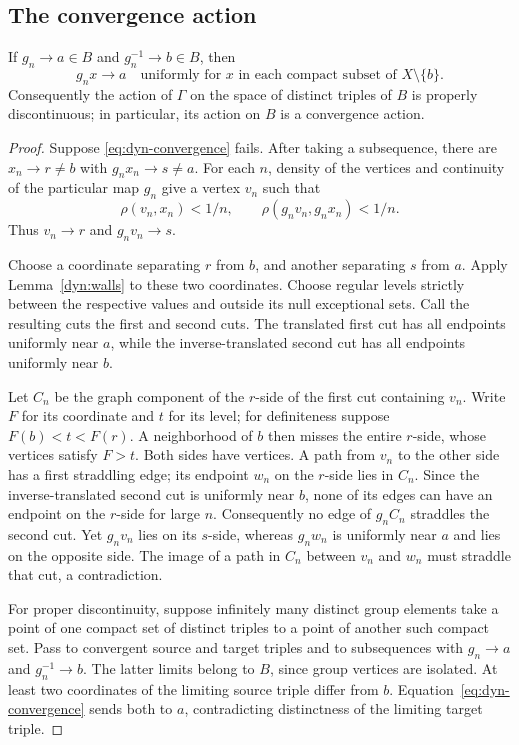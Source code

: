\subsection{The convergence action}

\begin{proposition}\label{dyn:convergence}
If $g_n\to a\in B$ and $g_n^{-1}\to b\in B$, then
\begin{equation}
 g_nx\longrightarrow a
 \quad\text{uniformly for $x$ in each compact subset of }X\setminus\{b\}.
 \label{eq:dyn-convergence}
\end{equation}
Consequently the action of $\Gamma$ on the space of distinct triples
of $B$ is properly discontinuous; in particular, its action on $B$ is
a convergence action.
\end{proposition}

\begin{proof}
Suppose \eqref{eq:dyn-convergence} fails. After taking a subsequence,
there are $x_n\to r\ne b$ with $g_nx_n\to s\ne a$. For each $n$,
density of the vertices and continuity of the particular map $g_n$
give a vertex $v_n$ such that
\[
 \rho(v_n,x_n)<1/n,
 \qquad \rho(g_nv_n,g_nx_n)<1/n.
\]
Thus $v_n\to r$ and $g_nv_n\to s$.

Choose a coordinate separating $r$ from $b$, and another separating
$s$ from $a$. Apply Lemma~\ref{dyn:walls} to these two coordinates.
Choose regular levels strictly between the respective values and
outside its null exceptional sets. Call the resulting cuts the first
and second cuts. The translated first cut has all endpoints uniformly
near $a$, while the inverse-translated second cut has all endpoints
uniformly near $b$.

Let $C_n$ be the graph component of the $r$-side of the first cut
containing $v_n$. Write $F$ for its coordinate and $t$ for its level;
for definiteness suppose $F(b)<t<F(r)$. A neighborhood of $b$ then
misses the entire $r$-side, whose vertices satisfy $F>t$.
Both sides have vertices. A path from $v_n$ to the
other side has a first straddling edge; its endpoint $w_n$ on the
$r$-side lies in $C_n$. Since the inverse-translated second cut is
uniformly near $b$, none of its edges can have an endpoint on the
$r$-side for large $n$. Consequently no edge of $g_nC_n$ straddles the
second cut. Yet $g_nv_n$ lies on its $s$-side, whereas $g_nw_n$ is
uniformly near $a$ and lies on the opposite side. The image of a path
in $C_n$ between $v_n$ and $w_n$ must straddle that cut, a
contradiction.

For proper discontinuity, suppose infinitely many distinct group
elements take a point of one compact set of distinct triples to a
point of another such compact set. Pass to convergent source and
target triples and to subsequences with $g_n\to a$ and
$g_n^{-1}\to b$. The latter limits belong to $B$, since group vertices
are isolated. At least two coordinates of the limiting source triple
differ from $b$. Equation~\eqref{eq:dyn-convergence} sends both to
$a$, contradicting distinctness of the limiting target triple.
\end{proof}

